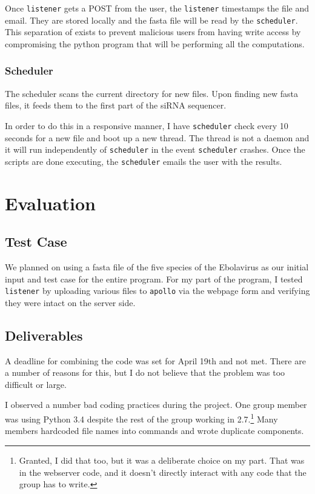 \documentclass[10pt,letterpaper]{article}
\begin{document}
Once \texttt{listener} gets a POST from the user, the \texttt{listener} timestamps the file  and email.
They are stored locally and the fasta file will be read by the \texttt{scheduler}.
This separation of exists to prevent malicious users from having write access by compromising the python program that will be performing all the computations.


\subsubsection{Scheduler}
The scheduler scans the current directory for new files.
Upon finding new fasta files, it feeds them to the first part of the siRNA sequencer.

In order to do this in a responsive manner, I have \texttt{scheduler} check every 10 seconds for a new file and boot up a new thread.
The thread is not a daemon and it will run independently of \texttt{scheduler} in the event \texttt{scheduler} crashes.
Once the scripts are done executing, the \texttt{scheduler} emails the user with the results.




\section{Evaluation}

\subsection{Test Case}
We planned on using a fasta file of the five species of the Ebolavirus as our initial input and test case for the entire program.
For my part of the program, I tested \texttt{listener} by uploading various files to \texttt{apollo} via the webpage form and verifying they were intact on the server side.


\subsection{Deliverables}
A deadline for combining the code was set for April 19th and not met.
There are a number of reasons for this, but I do not believe that the problem was too difficult or large.

I observed a number bad coding practices during the project.
One group member was using Python 3.4 despite the rest of the group working in 2.7.\footnote{Granted, I did that too, but it was a deliberate choice on my part.  That was in the webserver code, and it doesn't directly interact with any code that the group has to write.}
Many members hardcoded file names into commands and wrote duplicate components.
\end{document}
